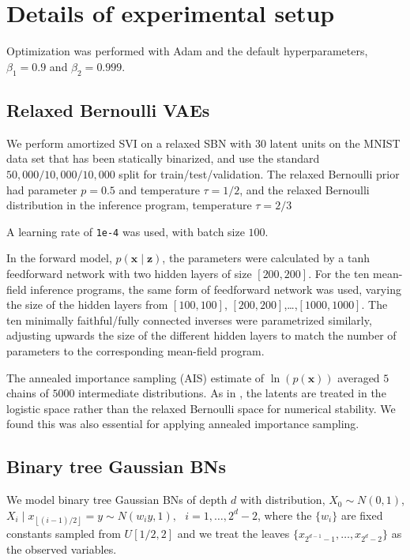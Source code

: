 \documentclass{article}
\begin{document}
\section{Details of experimental setup}
Optimization was performed with Adam \citep{KingmaBa2014} and the default hyperparameters, $\beta_1=0.9$ and $\beta_2=0.999$.

\subsection{Relaxed Bernoulli VAEs}
We perform amortized SVI on a relaxed SBN with 30 latent units on the MNIST data set that has been statically binarized, and use the standard $50,000/10,000/10,000$ split for train/test/validation.
The relaxed Bernoulli prior had parameter $p=0.5$ and temperature $\tau=1/2$, and the relaxed Bernoulli distribution in the inference program, temperature $\tau=2/3$

A learning rate of \texttt{1e-4} was used, with batch size $100$.

In the forward model, $p(\mathbf{x}\mid\mathbf{z})$, the parameters were calculated by a tanh feedforward network with two hidden layers of size $[200,200]$.
For the ten mean-field inference programs, the same form of feedforward network was used, varying the size of the hidden layers from $[100,100]$, $[200,200]$,\ldots,$[1000,1000]$. The ten minimally faithful/fully connected inverses were parametrized similarly, adjusting upwards the size of the different hidden layers to match the number of parameters to the corresponding mean-field program.

The annealed importance sampling (AIS) estimate of $\ln(p(\mathbf{x}))$ averaged $5$ chains of $5000$ intermediate distributions.
As in \citet[C.3]{MaddisonEtAl2016}, the latents are treated in the logistic space rather than the relaxed Bernoulli space for numerical stability.
We found this was also essential for applying annealed importance sampling.

\subsection{Binary tree Gaussian BNs}\label{sec:binary-tree}
We model binary tree Gaussian BNs of depth $d$ with distribution, $X_0 \sim N(0,1)$, $X_i\mid x_{\left\lfloor(i-1)/2\right\rfloor}=y \sim N(w_iy, 1),\ \ \ i=1,\ldots,2^d-2$, where the $\{w_i\}$ are fixed constants sampled from $U[1/2,2]$ and we treat the leaves $\{x_{2^{d-1}-1},\ldots,x_{2^d-2}\}$ as the observed variables.
\end{document}
